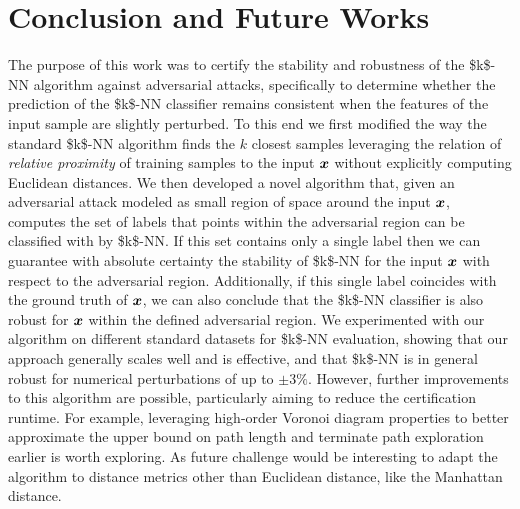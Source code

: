 
\chapter{Conclusion and Future Works}
\label{chp:conclusion-future-works}

The purpose of this work was to certify the stability and robustness of the \acs{$k$-NN} algorithm against adversarial attacks, specifically to determine whether the prediction of the \acs{$k$-NN} classifier remains consistent when the features of the input sample are slightly perturbed. To this end we first modified the way the standard \acs{$k$-NN} algorithm finds the $k$ closest samples leveraging the relation of \textit{relative proximity} of training samples to the input $\bm{x}$ without explicitly computing Euclidean distances. We then developed a novel algorithm that, given an adversarial attack modeled as small region of space around the input $\bm{x}$, computes the set of labels that points within the adversarial region can be classified with by \acs{$k$-NN}. If this set contains only a single label then we can guarantee with absolute certainty the stability of \acs{$k$-NN} for the input $\bm{x}$ with respect to the adversarial region. Additionally, if this single label coincides with the ground truth of $\bm{x}$, we can also conclude that the \acs{$k$-NN} classifier is also robust for $\bm{x}$ within the defined adversarial region. We experimented with our algorithm on different standard datasets for \acs{$k$-NN} evaluation, showing that our approach generally scales well and is effective, and that \acs{$k$-NN} is in general robust for numerical perturbations of up to $\pm 3\%$. However, further improvements to this algorithm are possible, particularly aiming to reduce the certification runtime. For example, leveraging high-order Voronoi diagram properties to better approximate the upper bound on path length and terminate path exploration earlier is worth exploring. As future challenge would be interesting to adapt the algorithm to distance metrics other than Euclidean distance, like the Manhattan distance.

